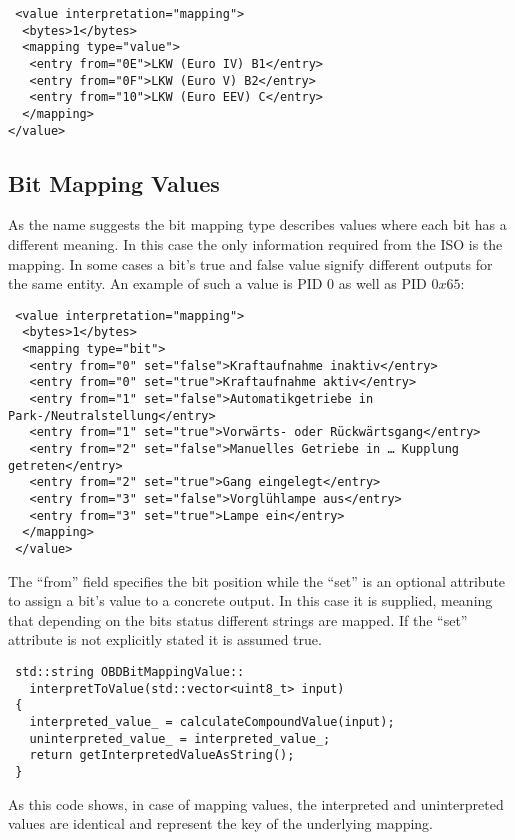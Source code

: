 \begin{verbatim}
 <value interpretation="mapping">
  <bytes>1</bytes>
  <mapping type="value">
   <entry from="0E">LKW (Euro IV) B1</entry>
   <entry from="0F">LKW (Euro V) B2</entry>
   <entry from="10">LKW (Euro EEV) C</entry>
  </mapping>        
</value>
\end{verbatim}

\subsection{Bit Mapping Values}

As the name suggests the bit mapping type describes values where each bit has a different meaning. In this case the only information required from the ISO is 
the mapping. In some cases a bit's true and false value signify different outputs for the same entity. An example of such a value is PID $0$ as well as PID $0x65$:

\begin{verbatim}
 <value interpretation="mapping">
  <bytes>1</bytes>
  <mapping type="bit">
   <entry from="0" set="false">Kraftaufnahme inaktiv</entry>
   <entry from="0" set="true">Kraftaufnahme aktiv</entry>
   <entry from="1" set="false">Automatikgetriebe in Park-/Neutralstellung</entry>
   <entry from="1" set="true">Vorwärts- oder Rückwärtsgang</entry>
   <entry from="2" set="false">Manuelles Getriebe in … Kupplung getreten</entry>
   <entry from="2" set="true">Gang eingelegt</entry>
   <entry from="3" set="false">Vorglühlampe aus</entry>
   <entry from="3" set="true">Lampe ein</entry>
  </mapping>
 </value>
\end{verbatim}

The ``from'' field specifies the bit position while the ``set'' is an optional attribute to assign a bit's value to a concrete output. In this 
case it is supplied, meaning that depending on the bits status different strings are mapped. If the ``set'' attribute is not explicitly stated it 
is assumed true.

\begin{verbatim}
 std::string OBDBitMappingValue::
   interpretToValue(std::vector<uint8_t> input)
 {
   interpreted_value_ = calculateCompoundValue(input);
   uninterpreted_value_ = interpreted_value_;
   return getInterpretedValueAsString();
 }
\end{verbatim}

As this code shows, in case of mapping values, the interpreted and uninterpreted values are identical and represent the key of the underlying mapping.

